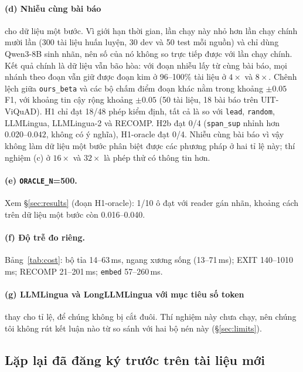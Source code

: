 \documentclass[11pt]{article}
\newcommand{\arm}[1]{\texttt{#1}}
\begin{document}
\paragraph{(d) Nhiễu cùng bài báo} cho dữ liệu một bước. Vì giới hạn thời gian, lần chạy này nhỏ hơn lần chạy chính
mười lần (300 tài liệu huấn luyện, 30 dev và 50 test mỗi nguồn) và chỉ dùng Qwen3-8B sinh nhãn, nên số của nó không so
trực tiếp được với lần chạy chính. Kết quả chính là dữ liệu vẫn bão hòa: với đoạn nhiễu lấy từ cùng bài báo, mọi nhánh
theo đoạn vẫn giữ được đoạn kim ở 96--100\% tài liệu ở $4\times$ và $8\times$. Chênh lệch giữa \arm{ours\_beta} và các
bộ chấm điểm đoạn khác nằm trong khoảng $\pm0.05$ F1, với khoảng tin cậy rộng khoảng $\pm0.05$ (50 tài liệu, 18 bài
báo trên UIT-ViQuAD). H1 chỉ đạt 18/48 phép kiểm định, tất cả là so với \arm{lead}, \arm{random}, LLMLingua,
LLMLingua-2 và RECOMP. H2b đạt 0/4 (\arm{span\_sup} nhỉnh hơn $0.020$--$0.042$, không có ý nghĩa), H1-oracle đạt
0/4. Nhiễu cùng bài báo vì vậy không làm dữ liệu một bước phân biệt được các phương pháp ở hai tỉ lệ này; thí nghiệm
(c) ở $16\times$ và $32\times$ là phép thử có thông tin hơn.

\paragraph{(e) \texttt{ORACLE\_N}=500.} Xem \S\ref{sec:results} (đoạn H1-oracle): 1/10 ô đạt với reader gán nhãn,
khoảng cách trên dữ liệu một bước còn 0.016--0.040.

\paragraph{(f) Độ trễ đo riêng.} Bảng~\ref{tab:cost}: bộ tỉa 14--63\,ms, ngang xương sống (13--71\,ms); EXIT
140--1010\,ms; RECOMP 21--201\,ms; \arm{embed} 57--260\,ms.

\paragraph{(g) LLMLingua và LongLLMLingua với mục tiêu số token} thay cho tỉ lệ, để chúng không bị cắt đuôi.
Thí nghiệm này chưa chạy, nên chúng tôi không rút kết luận nào từ so sánh với hai bộ nén này (\S\ref{sec:limits}).

\subsection{Lặp lại đã đăng ký trước trên tài liệu mới}
\label{sec:replication}
\end{document}
